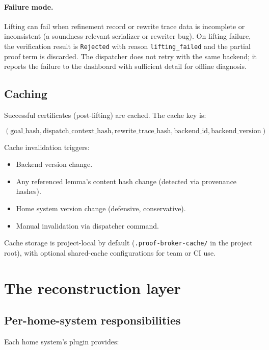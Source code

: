 \documentclass[11pt,letterpaper]{article}
\theoremstyle{definition}
\theoremstyle{remark}
\begin{document}
\paragraph{Failure mode.} Lifting can fail when refinement record or
rewrite trace data is incomplete or inconsistent (a soundness-relevant
serializer or rewriter bug). On lifting failure, the verification
result is \texttt{Rejected} with reason \texttt{lifting\_failed} and
the partial proof term is discarded. The dispatcher does not retry
with the same backend; it reports the failure to the dashboard with
sufficient detail for offline diagnosis.

\subsection{Caching}

Successful certificates (post-lifting) are cached. The cache key is:

\[
(\textrm{goal\_hash}, \textrm{dispatch\_context\_hash}, \textrm{rewrite\_trace\_hash}, \textrm{backend\_id}, \textrm{backend\_version})
\]

Cache invalidation triggers:

\begin{itemize}[leftmargin=2em]
  \item Backend version change.
  \item Any referenced lemma's content hash change (detected via
        provenance hashes).
  \item Home system version change (defensive, conservative).
  \item Manual invalidation via dispatcher command.
\end{itemize}

Cache storage is project-local by default
(\texttt{.proof-broker-cache/} in the project root), with optional
shared-cache configurations for team or CI use.

\section{The reconstruction layer}
\label{sec:reconstruction}

\subsection{Per-home-system responsibilities}

Each home system's plugin provides:
\end{document}
